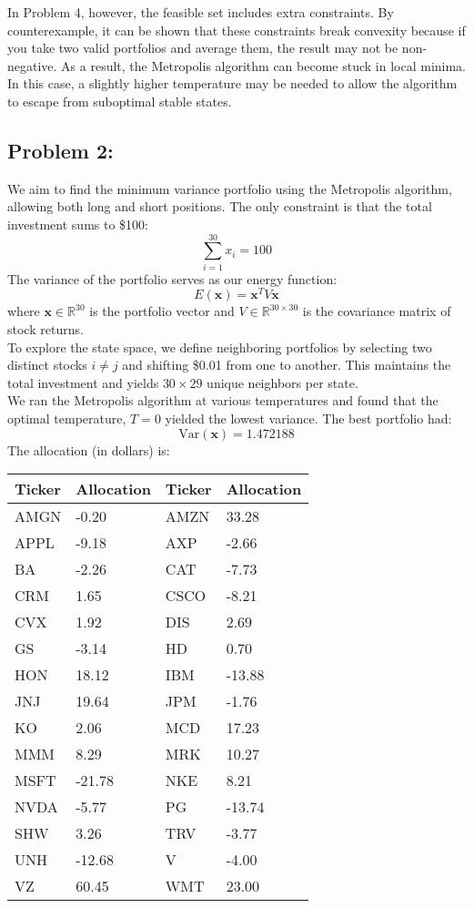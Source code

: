 \documentclass{report}
\begin{document}
In Problem 4, however, the feasible set includes extra constraints. By counterexample, it can be shown that these constraints break convexity because if you take two valid portfolios and average them, the result may not be non-negative. As a result, the Metropolis algorithm can become stuck in local minima. In this case, a slightly higher temperature may be needed to allow the algorithm to escape from suboptimal stable states.


\pagebreak


\subsection*{Problem 2:}


We aim to find the minimum variance portfolio using the Metropolis algorithm, allowing both long and short positions. The only constraint is that the total investment sums to \$100:
\[
\sum_{i=1}^{30} x_i = 100
\]
The variance of the portfolio serves as our energy function:
\[
E(\mathbf{x}) = \mathbf{x}^T V \mathbf{x}
\]
where \( \mathbf{x} \in \mathbb{R}^{30} \) is the portfolio vector and \( V \in \mathbb{R}^{30 \times 30} \) is the covariance matrix of stock returns. \\

To explore the state space, we define neighboring portfolios by selecting two distinct stocks $i \neq j$ and shifting \$0.01 from one to another. This maintains the total investment and yields $30 \times 29$ unique neighbors per state. \\

We ran the Metropolis algorithm at various temperatures and found that the optimal temperature, \( T = 0 \) yielded the lowest variance. The best portfolio had:
\[
\text{Var}(\mathbf{x}) = 1.472188
\]
The allocation (in dollars) is:

\begin{center}
\begin{tabular}{ll|ll}
\toprule
\textbf{Ticker} & \textbf{Allocation} & \textbf{Ticker} & \textbf{Allocation} \\
\midrule
AMGN & -0.20 & AMZN & 33.28 \\
APPL & -9.18 & AXP & -2.66 \\
BA & -2.26 & CAT & -7.73 \\
CRM & 1.65 & CSCO & -8.21 \\
CVX & 1.92 & DIS & 2.69 \\
GS & -3.14 & HD & 0.70 \\
HON & 18.12 & IBM & -13.88 \\
JNJ & 19.64 & JPM & -1.76 \\
KO & 2.06 & MCD & 17.23 \\
MMM & 8.29 & MRK & 10.27 \\
MSFT & -21.78 & NKE & 8.21 \\
NVDA & -5.77 & PG & -13.74 \\
SHW & 3.26 & TRV & -3.77 \\
UNH & -12.68 & V & -4.00 \\
VZ & 60.45 & WMT & 23.00 \\
\bottomrule
\end{tabular}
\end{center}
\end{document}
